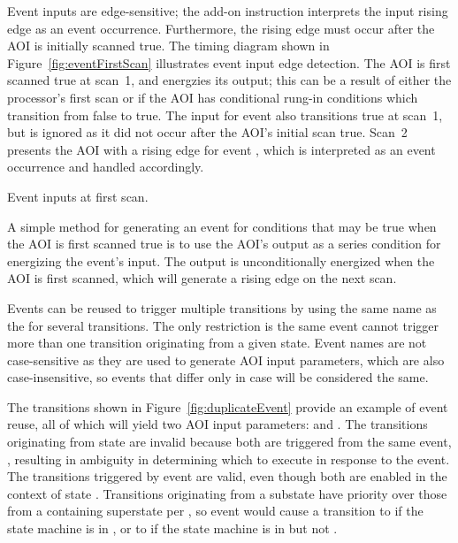 Event inputs are edge-sensitive; the add-on instruction interprets the
input rising edge as an event occurrence. Furthermore,
the rising edge must occur after the AOI is initially scanned true.
The timing diagram shown in Figure~\ref{fig:eventFirstScan} illustrates
event input edge detection. The AOI is first scanned true at scan~1, and
energzies its  output; this can be a result of either
the processor's first scan or if the AOI has conditional rung-in
conditions which transition from false to true.
The input for event  also transitions true at scan~1, but
is ignored as it did not occur after the AOI's initial scan true.
Scan~2 presents the AOI with a rising edge for event ,
which is interpreted as an event occurrence and handled accordingly.

               {Event inputs at first scan.}

A simple method for generating an event for conditions that may be
true when the AOI is first scanned true is to use the AOI's
 output as a series condition for energizing the
event's input. The  output is unconditionally energized
when the AOI is first scanned, which will generate a rising edge on the
next scan.

Events can be reused to trigger multiple transitions by using the
same name as the  for several transitions.
The only restriction is the same event cannot trigger more than
one transition originating from a given state.
Event names are not case-sensitive as they are used to generate AOI input
parameters, which are also case-insensitive, so events that differ only in
case will be considered the same.

The transitions shown in Figure~\ref{fig:duplicateEvent} provide an example
of event reuse, all of which will yield two AOI input parameters:
 and .
The transitions originating from state  are invalid because
both are triggered from the same event, ,
resulting in ambiguity in determining which to execute in response to the event.
The transitions triggered by event  are valid, even though both
are enabled in the context of state .
Transitions originating from a substate have priority over those
from a containing superstate per \textcite[\S14.2.3.9.4]{OMGUML}, so
event  would cause a transition to  if the
state machine is in , or to  if the state
machine is in  but not .

